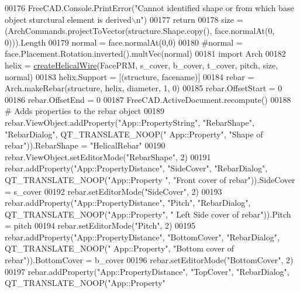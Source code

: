 \begin{DoxyCode}
00176         FreeCAD.Console.PrintError(\textcolor{stringliteral}{"Cannot identified shape or from which base object sturctural element is
       derived\(\backslash\)n"})
00177         \textcolor{keywordflow}{return}
00178     size = (ArchCommands.projectToVector(structure.Shape.copy(), face.normalAt(0, 0))).Length
00179     normal = face.normalAt(0,0)
00180     \textcolor{comment}{#normal = face.Placement.Rotation.inverted().multVec(normal)}
00181     \textcolor{keyword}{import} Arch
00182     helix = \hyperlink{namespaceHelicalRebar_a1a2b3ce39b904ab0c3892ed0965d2844}{createHelicalWire}(FacePRM, s\_cover, b\_cover, t\_cover, pitch, size, normal)
00183     helix.Support = [(structure, facename)]
00184     rebar = Arch.makeRebar(structure, helix, diameter, 1, 0)
00185     rebar.OffsetStart = 0
00186     rebar.OffsetEnd = 0
00187     FreeCAD.ActiveDocument.recompute()
00188     \textcolor{comment}{# Adds properties to the rebar object}
00189     rebar.ViewObject.addProperty(\textcolor{stringliteral}{"App::PropertyString"}, \textcolor{stringliteral}{"RebarShape"}, \textcolor{stringliteral}{"RebarDialog"}, QT\_TRANSLATE\_NOOP(\textcolor{stringliteral}{"
      App::Property"}, \textcolor{stringliteral}{"Shape of rebar"})).RebarShape = \textcolor{stringliteral}{"HelicalRebar"}
00190     rebar.ViewObject.setEditorMode(\textcolor{stringliteral}{"RebarShape"}, 2)
00191     rebar.addProperty(\textcolor{stringliteral}{"App::PropertyDistance"}, \textcolor{stringliteral}{"SideCover"}, \textcolor{stringliteral}{"RebarDialog"}, QT\_TRANSLATE\_NOOP(\textcolor{stringliteral}{"App::Property
      "}, \textcolor{stringliteral}{"Front cover of rebar"})).SideCover = s\_cover
00192     rebar.setEditorMode(\textcolor{stringliteral}{"SideCover"}, 2)
00193     rebar.addProperty(\textcolor{stringliteral}{"App::PropertyDistance"}, \textcolor{stringliteral}{"Pitch"}, \textcolor{stringliteral}{"RebarDialog"}, QT\_TRANSLATE\_NOOP(\textcolor{stringliteral}{"App::Property"}, \textcolor{stringliteral}{"
      Left Side cover of rebar"})).Pitch = pitch
00194     rebar.setEditorMode(\textcolor{stringliteral}{"Pitch"}, 2)
00195     rebar.addProperty(\textcolor{stringliteral}{"App::PropertyDistance"}, \textcolor{stringliteral}{"BottomCover"}, \textcolor{stringliteral}{"RebarDialog"}, QT\_TRANSLATE\_NOOP(\textcolor{stringliteral}{"
      App::Property"}, \textcolor{stringliteral}{"Bottom cover of rebar"})).BottomCover = b\_cover
00196     rebar.setEditorMode(\textcolor{stringliteral}{"BottomCover"}, 2)
00197     rebar.addProperty(\textcolor{stringliteral}{"App::PropertyDistance"}, \textcolor{stringliteral}{"TopCover"}, \textcolor{stringliteral}{"RebarDialog"}, QT\_TRANSLATE\_NOOP(\textcolor{stringliteral}{"App::Property"}

\end{DoxyCode}
